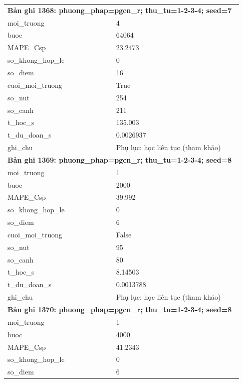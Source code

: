\begin{longtable}{p{0.43\linewidth}p{0.50\linewidth}}
\midrule
\multicolumn{2}{p{0.95\linewidth}}{\textbf{Bản ghi 1368: phuong\_phap=pgcn\_r; thu\_tu=1-2-3-4; seed=7}} \\
moi\_\allowbreak truong & 4 \\
buoc & 64064 \\
MAPE\_\allowbreak Csp & 23.2473 \\
so\_\allowbreak khong\_\allowbreak hop\_\allowbreak le & 0 \\
so\_\allowbreak diem & 16 \\
cuoi\_\allowbreak moi\_\allowbreak truong & True \\
so\_\allowbreak nut & 254 \\
so\_\allowbreak canh & 211 \\
t\_\allowbreak hoc\_\allowbreak s & 135.003 \\
t\_\allowbreak du\_\allowbreak doan\_\allowbreak s & 0.0026937 \\
ghi\_\allowbreak chu & Phụ lục: học liên tục (tham khảo) \\
\midrule
\multicolumn{2}{p{0.95\linewidth}}{\textbf{Bản ghi 1369: phuong\_phap=pgcn\_r; thu\_tu=1-2-3-4; seed=8}} \\
moi\_\allowbreak truong & 1 \\
buoc & 2000 \\
MAPE\_\allowbreak Csp & 39.992 \\
so\_\allowbreak khong\_\allowbreak hop\_\allowbreak le & 0 \\
so\_\allowbreak diem & 6 \\
cuoi\_\allowbreak moi\_\allowbreak truong & False \\
so\_\allowbreak nut & 95 \\
so\_\allowbreak canh & 80 \\
t\_\allowbreak hoc\_\allowbreak s & 8.14503 \\
t\_\allowbreak du\_\allowbreak doan\_\allowbreak s & 0.0013788 \\
ghi\_\allowbreak chu & Phụ lục: học liên tục (tham khảo) \\
\midrule
\multicolumn{2}{p{0.95\linewidth}}{\textbf{Bản ghi 1370: phuong\_phap=pgcn\_r; thu\_tu=1-2-3-4; seed=8}} \\
moi\_\allowbreak truong & 1 \\
buoc & 4000 \\
MAPE\_\allowbreak Csp & 41.2343 \\
so\_\allowbreak khong\_\allowbreak hop\_\allowbreak le & 0 \\
so\_\allowbreak diem & 6 \\

\end{longtable}
